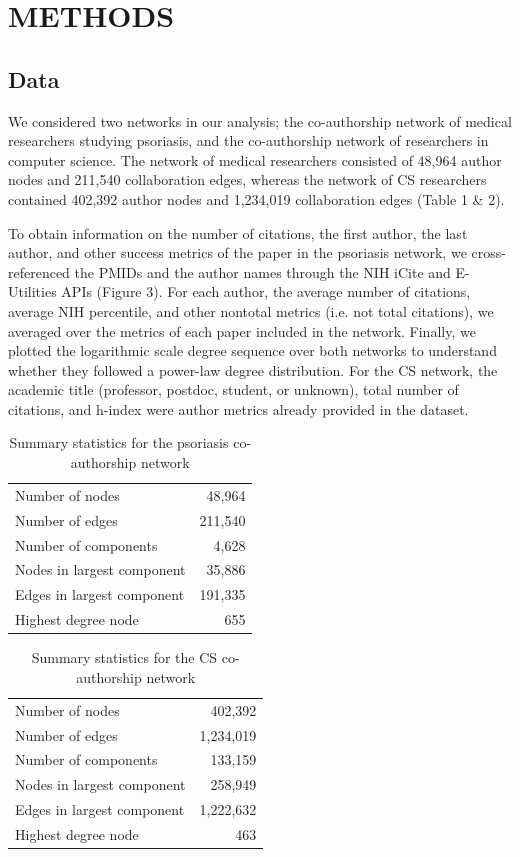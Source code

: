 \documentclass[9pt,twocolumn,twoside]{pnas-new}
\begin{document}
\section*{METHODS}
\subsection*{Data}  
 We considered two networks in our analysis; the co-authorship network of medical researchers studying psoriasis, and the co-authorship network of researchers in computer science. The network of medical researchers consisted of 48,964 author nodes and 211,540 collaboration edges, whereas the network of CS researchers contained 402,392 author nodes and 1,234,019 collaboration edges (Table 1 \& 2).
 \newline

 \noindent To obtain information on the number of citations, the first author, the last author, and other success metrics of the paper in the psoriasis network, we cross-referenced the PMIDs and the author names through the NIH iCite and E-Utilities APIs (Figure 3). For each author, the average number of citations, average NIH percentile, and other nontotal metrics (i.e. not total citations), we averaged over the metrics of each paper included in the network. Finally, we plotted the logarithmic scale degree sequence over both networks to understand whether they followed a power-law degree distribution. For the CS network, the academic title (professor, postdoc, student, or unknown), total number of citations, and h-index were author metrics already provided in the dataset. 
\begin{table}[H]
\centering
\caption{Summary statistics for the psoriasis co-authorship network}
\begin{tabular}{lr}
\midrule
Number of nodes & 48,964 \\
Number of edges & 211,540 \\
Number of components & 4,628 \\
Nodes in largest component & 35,886 \\
Edges in largest component & 191,335 \\
Highest degree node & 655 \\
\bottomrule
\end{tabular}

\end{table}
 \begin{table}[H]
\centering
\caption{Summary statistics for the CS co-authorship network}
\begin{tabular}{lr}
\midrule
Number of nodes &  402,392\\
Number of edges & 1,234,019\\
Number of components & 133,159\\
Nodes in largest component & 258,949\\
Edges in largest component & 1,222,632\\
Highest degree node & 463
\\
\bottomrule
\end{tabular}

\end{table}
\end{document}

